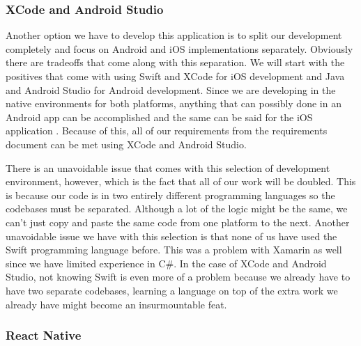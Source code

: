 \documentclass[onecolumn, draftclsnofoot,10pt, compsoc]{IEEEtran}
\begin{document}
\subsubsection{XCode and Android Studio}

Another option we have to develop this application is to split our development completely and focus on Android and iOS implementations separately.
Obviously there are tradeoffs that come along with this separation.
We will start with the positives that come with using Swift and XCode for iOS development and Java and Android Studio for Android development.
Since we are developing in the native environments for both platforms, anything that can possibly done in an Android app can be accomplished and the same can be said for the iOS application \cite{swift} \cite{androidstudio}.
Because of this, all of our requirements from the requirements document can be met using XCode and Android Studio.

There is an unavoidable issue that comes with this selection of development environment, however, which is the fact that all of our work will be doubled.
This is because our code is in two entirely different programming languages so the codebases must be separated.
Although a lot of the logic might be the same, we can't just copy and paste the same code from one platform to the next.
Another unavoidable issue we have with this selection is that none of us have used the Swift programming language before.
This was a problem with Xamarin as well since we have limited experience in C\#.
In the case of XCode and Android Studio, not knowing Swift is even more of a problem because we already have to have two separate codebases, learning a language on top of the extra work we already have might become an insurmountable feat.

\subsubsection{React Native}
\end{document}
